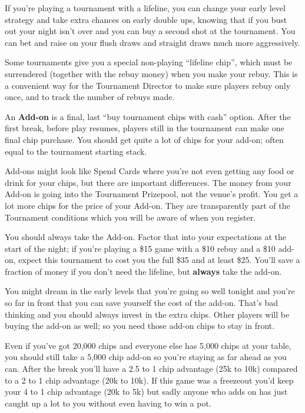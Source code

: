 If you're playing a tournament with a lifeline, you can change
your early level strategy and take extra chances on early
double ups, knowing that if you bust out your night isn't over and
you can buy a second shot at the tournament. You can bet and raise
on your flush draws and straight draws much more aggressively.

Some tournaments give you a special non-playing ``lifeline chip'',
which must be surrendered (together with the rebuy money) when you
make your rebuy. This is a convenient way for the Tournament
Director to make sure players rebuy only once, and to track the number
of rebuys made.

An \textbf{Add-on} is a final, last ``buy tournament chips with cash''
option. After the first break, before play resumes, players still
in the tournament can make one final chip purchase. You should get
quite a lot of chips for your add-on; often equal to the tournament
starting stack.

Add-ons might look like Spend Cards where you're not even
getting any food or drink for your chips, but there are important
differences. The money from your Add-on is going into the Tournament
Prizepool, not the venue's profit. You get a lot more chips for
the price of your Add-on. They are transparently part of the
Tournament conditions which you will be aware of when you register.

You should always take the Add-on. Factor that into your expectations
at the start of the night; if you're playing a \$15 game with a \$10
rebuy and a \$10 add-on, expect this tournament to cost you the full
\$35 and at least \$25. You'll save a fraction of money if you don't
need the lifeline, but \textbf{always} take the add-on.

You might dream in the early levels that you're going so well
tonight and you're so far in front that you can save yourself
the cost of the add-on. That's bad thinking and you should always
invest in the extra chips. Other players will be buying the add-on
as well; so you need those add-on chips to stay in front.

Even if you've got 20,000 chips and everyone else has 5,000 chips at
your table, you should still take a 5,000 chip add-on so you're staying
as far ahead as you can. After the break you'll have a 2.5 to 1 chip
advantage (25k to 10k) compared to a 2 to 1 chip advantage (20k to 10k).
If this game was a freezeout you'd keep your 4 to 1 chip advantage
(20k to 5k) but sadly anyone who adds on has just caught up a lot to you
without even having to win a pot.

